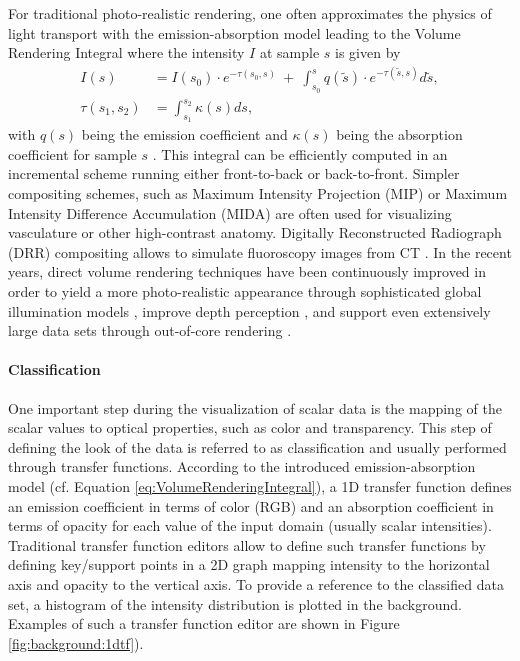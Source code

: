 For traditional photo-realistic rendering, one often approximates the physics of light transport with the emission-absorption model leading to the Volume Rendering Integral where the intensity $I$ at sample $s$ is given by
\begin{equation}
	\label{eq:VolumeRenderingIntegral}
	\begin{split}
		I(s)			&= 	I(s_0) \cdot e^{-\tau(s_0, s)} \ + \ \int_{s_0}^{s} q(\tilde{s}) \cdot e^{-\tau(\tilde{s}, s)} d\tilde{s}, \\	
		\tau(s_1, s_2) 	&=	\int_{s_1}^{s_2} \kappa(s) ds,
	\end{split}	
\end{equation}
with $q(s)$ being the emission coefficient and $\kappa(s)$ being the absorption coefficient for sample $s$ \cite{Max:1995:VolumeRenderingIntegral}.
This integral can be efficiently computed in an incremental scheme running either front-to-back or back-to-front.
Simpler compositing schemes, such as Maximum Intensity Projection (MIP) or Maximum Intensity Difference Accumulation (MIDA) \cite{Bruckner:2009:MIDA} are often used for visualizing vasculature or other high-contrast anatomy.
Digitally Reconstructed Radiograph (DRR) compositing allows to simulate fluoroscopy images from CT \cite{Metz:2005:DRR, Milickovic:2000:DRR}.
In the recent years, direct volume rendering techniques have been continuously improved in order to yield a more photo-realistic appearance through sophisticated global illumination models \cite{Lindemann:2011:IlluminationSurvey, Joensson:2014:IlluminationSurvey}, improve depth perception \cite{Svakhine:2009:DepthEnhancing, Kersten-Oertel:2014:DepthEnhancing}, and support even extensively large data sets through out-of-core rendering \cite{Crassin:2009:GigaVoxels,Crassin:2011:GigaVoxels}.


\paragraph{Classification}
One important step during the visualization of scalar data is the mapping of the scalar values to optical properties, such as color and transparency.
This step of defining the look of the data is referred to as classification and usually performed through transfer functions.
According to the introduced emission-absorption model (cf. Equation \ref{eq:VolumeRenderingIntegral}), a  1D transfer function defines an emission coefficient in terms of color (RGB) and an absorption coefficient in terms of opacity for each value of the input domain (usually scalar intensities).
Traditional transfer function editors allow to define such transfer functions by defining key/support points in a 2D graph mapping intensity to the horizontal axis and opacity to the vertical axis.
To provide a reference to the classified data set, a histogram of the intensity distribution is plotted in the background.
Examples of such a transfer function editor are shown in Figure \ref{fig:background:1dtf}).


